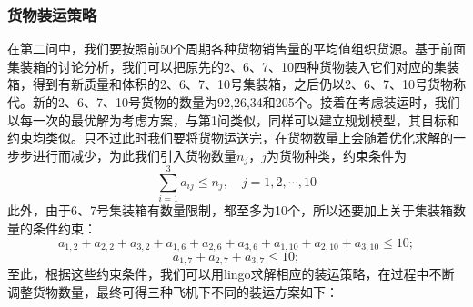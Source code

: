\documentclass{article}
\begin{document}
	\subsubsection{货物装运策略}
	在第二问中，我们要按照前50个周期各种货物销售量的平均值组织货源。基于前面集装箱的讨论分析，我们可以把原先的2、6、7、10四种货物装入它们对应的集装箱，得到有新质量和体积的2、6、7、10号集装箱，之后仍以2、6、7、10号货物称代。新的2、6、7、10号货物的数量为92,26,34和205个。接着在考虑装运时，我们以每一次的最优解为考虑方案，与第1问类似，同样可以建立规划模型，其目标和约束均类似。只不过此时我们要将货物运送完，在货物数量上会随着优化求解的一步步进行而减少，为此我们引入货物数量$n_{j}$，$j$为货物种类，约束条件为
	\begin{equation}
		\sum_{i=1}^{3}a_{ij}\leq n_j ,\quad j=1,2,\cdots,10
	\end{equation}
	此外，由于6、7号集装箱有数量限制，都至多为10个，所以还要加上关于集装箱数量的条件约束：
	\begin{equation}
		a_{1,2}+a_{2,2}+a_{3,2}+a_{1,6}+a_{2,6}+a_{3,6}+a_{1,10}+a_{2,10}+a_{3,10}\leq 10;
	\end{equation}
	\begin{equation}
		a_{1,7}+a_{2,7}+a_{3,7}\leq 10;
	\end{equation}
	至此，根据这些约束条件，我们可以用lingo求解相应的装运策略，在过程中不断调整货物数量，最终可得三种飞机下不同的装运方案如下：
	\newpage
\end{document}
